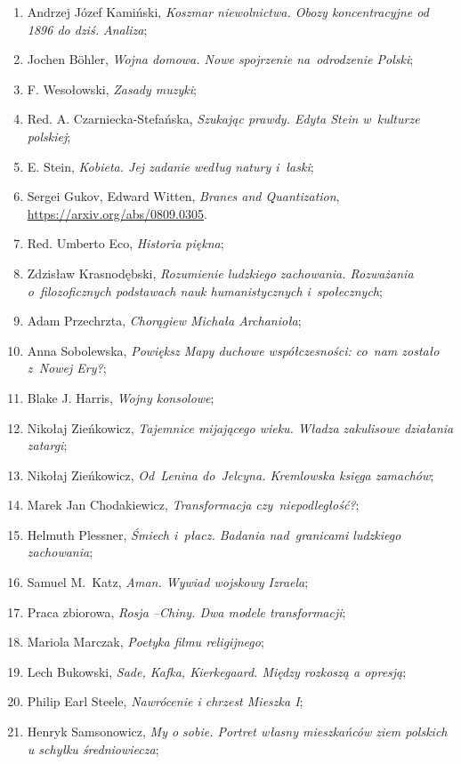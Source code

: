\documentclass[a4paper,11pt]{article}
\begin{document}
\begin{enumerate}
\item Andrzej Józef Kamiński, \emph{Koszmar niewolnictwa. Obozy
    koncentracyjne od 1896 do dziś. Analiza};
\item Jochen B\"{o}hler, \emph{Wojna domowa. Nowe spojrzenie
    na~odrodzenie Polski};
\item F. Wesołowski, \emph{Zasady muzyki};
\item Red. A. Czarniecka-Stefańska, \emph{Szukając prawdy. Edyta Stein
    w~kulturze polskiej};
\item E. Stein, \emph{Kobieta. Jej zadanie według natury i~łaski};
\item Sergei Gukov, Edward Witten, \emph{Branes and Quantization},
  \href{https://arxiv.org/abs/0809.0305}{https://arxiv.org/abs/0809.0305}.
\item Red. Umberto Eco, \emph{Historia piękna};
\item Zdzisław Krasnodębski, \emph{Rozumienie ludzkiego zachowania.
    Rozważania o~filozoficznych podstawach nauk humanistycznych
    i~społecznych};
\item Adam Przechrzta, \emph{Chorągiew Michała Archanioła};
\item Anna Sobolewska, \emph{Powiększ Mapy duchowe współczesności:
    co~nam zostało z~Nowej Ery?};
\item Blake J. Harris, \emph{Wojny konsolowe};
\item Nikołaj Zieńkowicz, \emph{Tajemnice mijającego wieku. Władza
    zakulisowe działania zatargi};
\item Nikołaj Zieńkowicz, \emph{Od~Lenina do~Jelcyna. Kremlowska
    księga zamachów};
\item Marek Jan Chodakiewicz, \emph{Transformacja czy~niepodległość?};
\item Helmuth Plessner, \emph{Śmiech i~płacz. Badania nad~granicami
    ludzkiego zachowania};
\item Samuel M.~Katz, \emph{Aman. Wywiad wojskowy Izraela};
\item Praca zbiorowa, \emph{Rosja --Chiny. Dwa modele transformacji};
\item Mariola Marczak, \emph{Poetyka filmu religijnego};
\item Lech Bukowski, \emph{Sade, Kafka, Kierkegaard. Między rozkoszą a
    opresją};
\item Philip Earl Steele, \emph{Nawrócenie i chrzest Mieszka I};
\item Henryk Samsonowicz, \emph{My o sobie. Portret własny mieszkańców
    ziem polskich u schyłku średniowiecza};

\end{enumerate}
\end{document}
